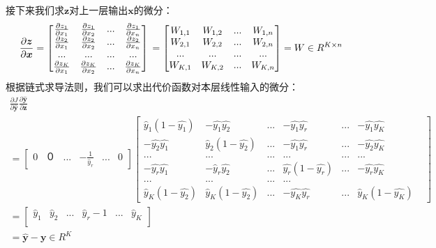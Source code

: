 \documentclass[UTF8]{article}
\begin{document}
接下来我们求$\boldsymbol{z}$对上一层输出$\boldsymbol{x}$的微分：
\begin{equation}
\frac{\partial{\boldsymbol{z}}}{\partial{\boldsymbol{x}}}=\begin{bmatrix}
\frac{\partial{z_{1}}}{\partial{x_{1}}} & \frac{\partial{z_{1}}}{\partial{x_{2}}} & ... & \frac{\partial{z_{1}}}{\partial{x_{n}}} \\
\frac{\partial{z_{2}}}{\partial{x_{1}}} & \frac{\partial{z_{2}}}{\partial{x_{2}}} & ... & \frac{\partial{z_{2}}}{\partial{x_{n}}} \\
... & ... & ... & ... \\
\frac{\partial{z_{K}}}{\partial{x_{1}}} & \frac{\partial{z_{K}}}{\partial{x_{2}}} & ... & \frac{\partial{z_{K}}}{\partial{x_{n}}} \\
\end{bmatrix} \\
=\begin{bmatrix}
W_{1,1} & W_{1,2} & ... & W_{1,n} \\
W_{2,1} & W_{2,2} & ... & W_{2,n} \\
... & ... & ... & ... \\
W_{K,1} & W_{K,2} & ... & W_{K,n}
\end{bmatrix}=W \in R^{K \times n}
\label{mlp-pz-px-def}
\end{equation}
根据链式求导法则，我们可以求出代价函数对本层线性输入的微分：
\begin{equation}
\begin{aligned}
\frac{\partial{J}}{\partial{\hat{\boldsymbol{y}}}} \frac{\partial{\hat{\boldsymbol{y}}}}{\partial{\boldsymbol{z}}} \\
=\begin{bmatrix}
0 & ０　& ... & -\frac{1}{\hat{y}_{r}} & ... & 0
\end{bmatrix}
\begin{bmatrix}
\hat{y}_{1}(1-\hat{y_{1}}) & -\hat{y_{1}}\hat{y_{2}} & ... & -\hat{y_{1}}\hat{y_{r}} & ... & -\hat{y_{1}}\hat{y_{K}} \\
-\hat{y_{2}}\hat{y_{1}} & \hat{y}_{2}(1-\hat{y_{2}}) & ... & -\hat{y_{1}}\hat{y_{r}} & ... & -\hat{y_{2}}\hat{y_{K}} \\
... & ... & ... &　... & ... & ... \\
-\hat{y_{r}}\hat{y_{1}} & -\hat{y}_{r}\hat{y_{2}} & ... & \hat{y_{r}}(1-\hat{y_{r}}) & ... & -\hat{y_{r}}\hat{y_{K}} \\
...& ... & ... & ... \\
\hat{y}_{K}(1-\hat{y_{2}}) & \hat{y}_{K}(1-\hat{y_{2}}) & ... &-\hat{y_{K}}\hat{y_{r}} & ... & \hat{y}_{K}(1-\hat{y_{K}}) &
\end{bmatrix} \\
=\begin{bmatrix}
\hat{y}_{1} & \hat{y}_{2} & ... & \hat{y}_{r}-1 & ... & \hat{y}_{K} \\
\end{bmatrix} \\
=\hat{\boldsymbol{y}}-\boldsymbol{y} \in R^{K}
\end{aligned}
\label{mlp-pj-pz-def}
\end{equation}
\end{document}
